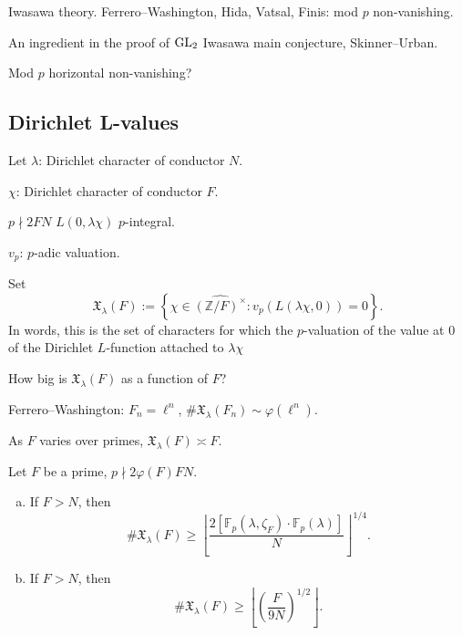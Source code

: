 \documentclass[reqno]{amsart} 
\begin{document}
Iwasawa theory.  Ferrero--Washington, Hida, Vatsal, Finis: mod $p$ non-vanishing.

An ingredient in the proof of $\operatorname{GL}_2$ Iwasawa main conjecture, Skinner--Urban.

Mod $p$ horizontal non-vanishing?

\subsection{Dirichlet L-values}
Let $\lambda$: Dirichlet character of conductor $N$.

$\chi$: Dirichlet character of conductor $F$.

$p \nmid 2 F N$ $L(0, \lambda \chi)$ $p$-integral.

$v_p$: $p$-adic valuation.

Set
\begin{equation*}
\mathfrak{X}_\lambda(F) := \left\{ \chi \in \widehat{(\mathbb{Z} / F)^\times } : v_p \left( L(\lambda \chi, 0) \right) = 0 \right\}.
\end{equation*}
In words, this is the set of characters for which the $p$-valuation of the value at $0$ of the Dirichlet $L$-function attached to $\lambda \chi$

\begin{question}\label{question:cnfg5j4tbm}
  How big is $\mathfrak{X}_\lambda(F) $ as a function of $F$?
\end{question}

Ferrero--Washington: $F_n = \ell^n$, $\# \mathfrak{X}_\lambda(F_n) \sim \varphi(\ell^n)$.

As $F$ varies over primes, $\mathfrak{X}_\lambda(F) \asymp F$.

\begin{theorem}[Sun--B]\label{theorem:cnfg5jyjlh}
  Let $F$ be a prime, $p \nmid 2 \varphi(F) F N$.
  \begin{enumerate}[(a)]
  \item\label{enumerate:cnekzumaui} If $F > N$, then
    \begin{equation*}
      \# \mathfrak{X}_\lambda(F) \geq
      \left\lfloor
        \frac{2 [\mathbb{F}_p(\lambda, \zeta_F ) \cdot \mathbb{F}_p(\lambda) ]}{N}
      \right\rfloor^{1/4}.
    \end{equation*}
  \item\label{enumerate:cnekzumb90} If $F > N$, then
    \begin{equation*}
      \# \mathfrak{X}_\lambda(F) \geq
      \left\lfloor
        \left( \frac{F}{9 N} \right)^{1/2}
      \right\rfloor.
    \end{equation*}
  \end{enumerate}
\end{theorem}
\end{document}
